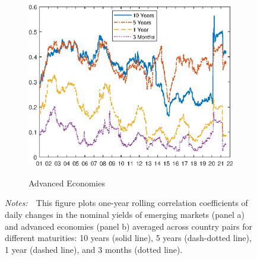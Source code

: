 \documentclass[a4paper, 12pt]{article}
\newcommand{\figtext}[1]{
	\vspace{-1ex}
	\captionsetup{justification=justified,font=footnotesize}
	\caption*{#1}
}
\newcommand{\fignotes}[1]{\figtext{\emph{Notes:~}~#1}}
\begin{document}
\begin{appendices}
\begin{figure}[tbph]
\begin{center}
\begin{minipage}{0.9\linewidth}
\begin{center}
					\begin{subfigure}[t]{\linewidth}
						\includegraphics[trim={0cm 0cm 0cm 0cm},clip,height=0.38\textheight,width=\linewidth]{../Figures/rolling_dn_data_AE.eps} \\
						\vspace{-0.37cm}
						\caption{Advanced Economies} \label{subfig:rolling_tsAE}
						\vspace{0.4cm}
					\end{subfigure}
					
				\end{center}
				\vspace{-0.45cm}
				\fignotes{This figure plots one-year rolling correlation coefficients of daily changes in the nominal yields of emerging markets (panel a) and advanced economies (panel b) averaged across country pairs for different maturities: 10 years (solid line), 5 years (dash-dotted line), 1 year (dashed line), and 3 months (dotted line).}
			\end{minipage}
		\end{center}
	\end{figure}
	

\end{appendices}
\end{document}
